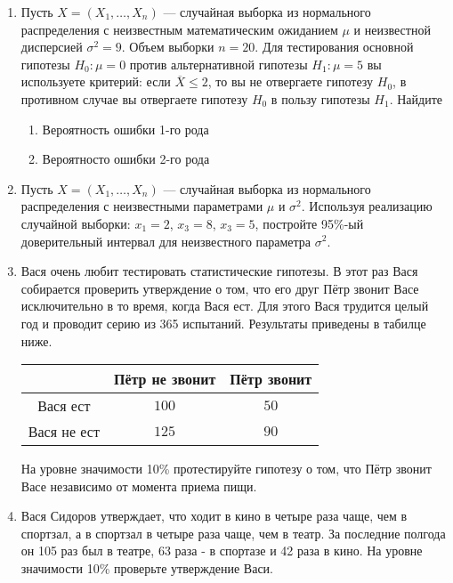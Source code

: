 \begin{enumerate}


	\item Пусть $X=(X_{1}, \ldots,X_{n})$ — случайная выборка из нормального распределения с неизвестным математическим ожиданием $\mu$ и неизвестной дисперсией $\sigma^2=9$. Объем выборки $n=20$. Для тестирования основной гипотезы $H_{0}:\mu=0$ против альтернативной гипотезы $H_{1}:\mu=5$ вы используете критерий: если $\overline{X}\leq2$, то вы не отвергаете гипотезу $H_{0}$, в противном случае вы отвергаете гипотезу $H_{0}$ в пользу гипотезы $H_{1}$. Найдите
	\begin{enumerate}
	\item Вероятность ошибки 1-го рода
	\item Вероятносто ошибки 2-го рода
	\end{enumerate}


		\item Пусть $X=(X_{1}, \ldots,X_{n})$ — случайная выборка из нормального распределения с неизвестными параметрами $\mu$ и $\sigma^2$. Используя реализацию случайной выборки: $x_{1}=2$, $x_{3}=8$, $x_{3}=5$, постройте 95\%-ый доверительный интервал для неизвестного параметра $\sigma^2$.


	\item Вася очень любит тестировать статистические гипотезы. В этот раз Вася собирается проверить утверждение о том, что его друг Пётр звонит Васе исключительно в то время, когда Вася ест. Для этого Вася трудится целый год и проводит серию из 365 испытаний. Результаты приведены в табилце ниже.

	\begin{center}
		\begin{tabular}{c|cc}
			\toprule
			& Пётр не звонит & Пётр звонит\\
			\midrule
			Вася ест & $100$ & $50$\\
			Вася не ест  & $125$ & $90$\\
			\bottomrule
		\end{tabular}
	\end{center}

	На уровне значимости 10\% протестируйте гипотезу о том, что Пётр звонит Васе независимо от момента приема пищи.


\item Вася Сидоров утверждает, что ходит в кино в четыре раза чаще, чем в спортзал, а в спортзал в четыре раза чаще, чем в театр. За последние полгода он 105 раз был в театре, 63 раза - в спортазе и 42 раза в кино. На уровне значимости 10\% проверьте утверждение Васи.

\end{enumerate}


